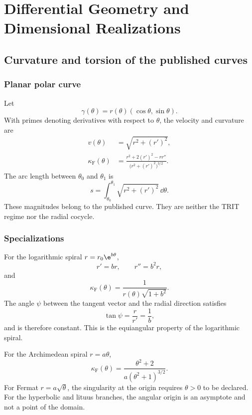\part{Differential Geometry and Dimensional Realizations}

\chapter{Curvature and torsion of the published curves}

\section{Planar polar curve}

Let
\[
 \gamma(\theta)=r(\theta)(\cos\theta,\sin\theta).
\]
With primes denoting derivatives with respect to \(\theta\), the velocity and curvature are
\begin{align}
 v(\theta)&=\sqrt{r^2+(r')^2},\\
 \kappa_{\mathrm{F}}(\theta)&=
 \frac{r^2+2(r')^2-rr''}
 {\bigl(r^2+(r')^2\bigr)^{3/2}}.
 \label{espiral:eq:curvatura-polar}
\end{align}
The arc length between \(\theta_0\) and \(\theta_1\) is
\[
 s=\int_{\theta_0}^{\theta_1}
 \sqrt{r^2+(r')^2}\,\dd\theta.
\]
These magnitudes belong to the published curve. They are neither the TRIT regime nor
the radial cocycle.

\section{Specializations}

For the logarithmic spiral \(r=r_0\e^{b\theta}\),
\[
 r'=br,\qquad r''=b^2r,
\]
and
\begin{equation}
 \kappa_{\mathrm{F}}(\theta)
 =\frac{1}{r(\theta)\sqrt{1+b^2}}.
 \label{espiral:eq:curvatura-log}
\end{equation}
The angle \(\psi\) between the tangent vector and the radial direction satisfies
\[
 \tan\psi=\frac{r}{r'}=\frac1b,
\]
and is therefore constant. This is the equiangular property of the logarithmic
spiral.


For the Archimedean spiral \(r=a\theta\),
\[
 \kappa_{\mathrm{F}}(\theta)
 =\frac{\theta^2+2}{a(\theta^2+1)^{3/2}}.
\]
For Fermat \(r=a\sqrt\theta\), the singularity at the origin requires
\(\theta>0\) to be declared. For the hyperbolic and lituus branches, the
angular origin is an asymptote and not a point of the domain.
